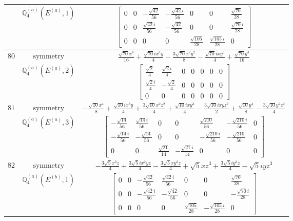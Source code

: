 \documentclass[fleqn,8pt,landscape]{jsarticle}
\begin{document}
\begin{longtable}{ccc}
$  $ & $ \mathbb{Q}_{4}^{(a)}(E^{(a)},1) $ & $ \begin{bmatrix} 0 & 0 & - \frac{\sqrt{42}}{56} & - \frac{\sqrt{42} i}{56} & 0 & 0 & \frac{\sqrt{70}}{28} \\ 0 & 0 & \frac{\sqrt{42} i}{56} & - \frac{\sqrt{42}}{56} & 0 & 0 & \frac{\sqrt{70} i}{28} \\ 0 & 0 & 0 & 0 & \frac{\sqrt{105}}{28} & \frac{\sqrt{105} i}{28} & 0 \end{bmatrix} $ \\ \hline
$ 80 $ & $ \text{symmetry} $ & $ \frac{\sqrt{70} x^{4}}{16} + \frac{\sqrt{70} i x^{3} y}{4} - \frac{3 \sqrt{70} x^{2} y^{2}}{8} - \frac{\sqrt{70} i x y^{3}}{4} + \frac{\sqrt{70} y^{4}}{16} $ \\
$  $ & $ \mathbb{Q}_{4}^{(a)}(E^{(a)},2) $ & $ \begin{bmatrix} \frac{\sqrt{2}}{4} & \frac{\sqrt{2} i}{4} & 0 & 0 & 0 & 0 & 0 \\ \frac{\sqrt{2} i}{4} & - \frac{\sqrt{2}}{4} & 0 & 0 & 0 & 0 & 0 \\ 0 & 0 & 0 & 0 & 0 & 0 & 0 \end{bmatrix} $ \\ \hline
$ 81 $ & $ \text{symmetry} $ & $ - \frac{\sqrt{10} x^{4}}{8} + \frac{\sqrt{10} i x^{3} y}{4} + \frac{3 \sqrt{10} x^{2} z^{2}}{4} + \frac{\sqrt{10} i x y^{3}}{4} - \frac{3 \sqrt{10} i x y z^{2}}{2} + \frac{\sqrt{10} y^{4}}{8} - \frac{3 \sqrt{10} y^{2} z^{2}}{4} $ \\
$  $ & $ \mathbb{Q}_{4}^{(a)}(E^{(a)},3) $ & $ \begin{bmatrix} - \frac{\sqrt{14}}{56} & \frac{\sqrt{14} i}{56} & 0 & 0 & \frac{\sqrt{210}}{56} & - \frac{\sqrt{210} i}{56} & 0 \\ - \frac{\sqrt{14} i}{56} & - \frac{\sqrt{14}}{56} & 0 & 0 & - \frac{\sqrt{210} i}{56} & - \frac{\sqrt{210}}{56} & 0 \\ 0 & 0 & \frac{\sqrt{21}}{14} & - \frac{\sqrt{21} i}{14} & 0 & 0 & 0 \end{bmatrix} $ \\ \hline
$ 82 $ & $ \text{symmetry} $ & $ - \frac{3 \sqrt{5} x^{3} z}{4} + \frac{3 \sqrt{5} i x^{2} y z}{4} - \frac{3 \sqrt{5} x y^{2} z}{4} + \sqrt{5} x z^{3} + \frac{3 \sqrt{5} i y^{3} z}{4} - \sqrt{5} i y z^{3} $ \\
$  $ & $ \mathbb{Q}_{4}^{(a)}(E^{(b)},1) $ & $ \begin{bmatrix} 0 & 0 & - \frac{\sqrt{42}}{56} & \frac{\sqrt{42} i}{56} & 0 & 0 & \frac{\sqrt{70}}{28} \\ 0 & 0 & - \frac{\sqrt{42} i}{56} & - \frac{\sqrt{42}}{56} & 0 & 0 & - \frac{\sqrt{70} i}{28} \\ 0 & 0 & 0 & 0 & \frac{\sqrt{105}}{28} & - \frac{\sqrt{105} i}{28} & 0 \end{bmatrix} $ \\ \hline

\end{longtable}
\end{document}
